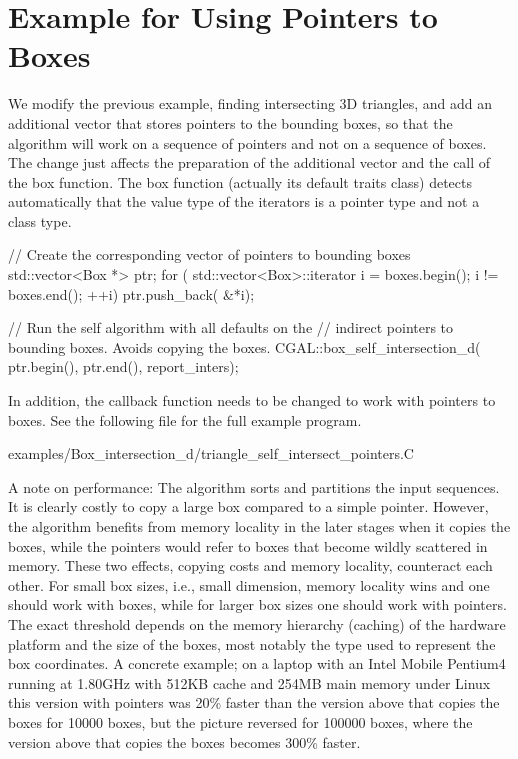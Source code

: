 

\section{Example for Using Pointers to Boxes}

We modify the previous example, finding intersecting 3D triangles,
and add an additional vector  that stores pointers to the bounding
boxes, so that the  algorithm will work on a sequence of
pointers and not on a sequence of boxes. The change just affects the
preparation of the additional vector and the call of the box 
function. The box  function (actually its default traits
class) detects automatically that the value type of the iterators is a
pointer type and not a class type.

\begin{ccExampleCode}
    // Create the corresponding vector of pointers to bounding boxes
    std::vector<Box *> ptr;
    for ( std::vector<Box>::iterator i = boxes.begin(); i != boxes.end(); ++i)
        ptr.push_back( &*i);
    
    // Run the self  algorithm with all defaults on the 
    // indirect pointers to bounding boxes. Avoids copying the boxes.
    CGAL::box_self_intersection_d( ptr.begin(), ptr.end(), report_inters);
\end{ccExampleCode}

In addition, the callback function  needs to be
changed to work with pointers to boxes. See the following file for the
full example program.

\begin{ccExampleCode}
    examples/Box_intersection_d/triangle_self_intersect_pointers.C
\end{ccExampleCode}

A note on performance: The algorithm sorts and partitions the input
sequences. It is clearly costly to copy a large box compared to a
simple pointer. However, the algorithm benefits from memory locality
in the later stages when it copies the boxes, while the pointers would
refer to boxes that become wildly scattered in memory.  These two
effects, copying costs and memory locality, counteract each other. For
small box sizes, i.e., small dimension, memory locality wins and one
should work with boxes, while for larger box sizes one should work
with pointers. The exact threshold depends on the memory hierarchy
(caching) of the hardware platform and the size of the boxes, most
notably the type used to represent the box coordinates. A concrete
example; on a laptop with an Intel Mobile Pentium4 running at 1.80GHz
with 512KB cache and 254MB main memory under Linux this version with
pointers was 20\% faster than the version above that copies the boxes
for 10000 boxes, but the picture reversed for 100000 boxes, where the
version above that copies the boxes becomes 300\% faster.

